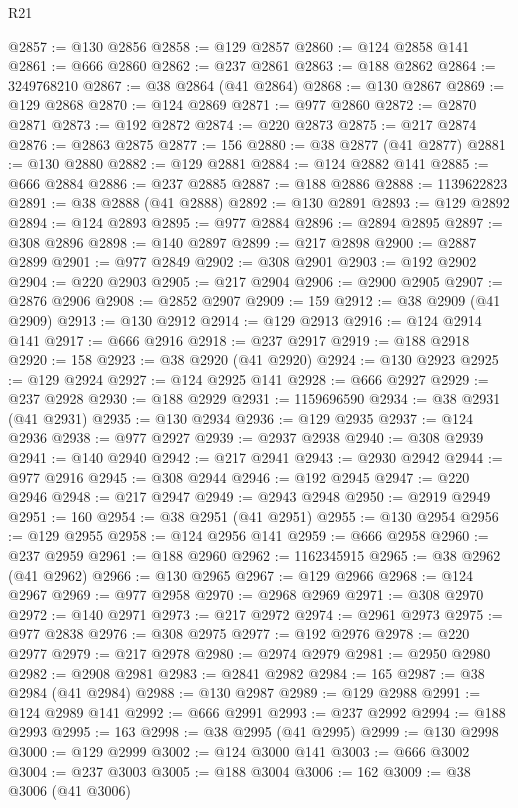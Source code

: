 \begin{lexlean}{R21}
\begin{coremodule}
@2857 := @130 @2856
@2858 := @129 @2857
@2860 := @124 @2858 @141
@2861 := @666 @2860
@2862 := @237 @2861
@2863 := @188 @2862
@2864 := 3249768210
@2867 := @38 @2864 (@41 @2864)
@2868 := @130 @2867
@2869 := @129 @2868
@2870 := @124 @2869
@2871 := @977 @2860
@2872 := @2870 @2871
@2873 := @192 @2872
@2874 := @220 @2873
@2875 := @217 @2874
@2876 := @2863 @2875
@2877 := 156
@2880 := @38 @2877 (@41 @2877)
@2881 := @130 @2880
@2882 := @129 @2881
@2884 := @124 @2882 @141
@2885 := @666 @2884
@2886 := @237 @2885
@2887 := @188 @2886
@2888 := 1139622823
@2891 := @38 @2888 (@41 @2888)
@2892 := @130 @2891
@2893 := @129 @2892
@2894 := @124 @2893
@2895 := @977 @2884
@2896 := @2894 @2895
@2897 := @308 @2896
@2898 := @140 @2897
@2899 := @217 @2898
@2900 := @2887 @2899
@2901 := @977 @2849
@2902 := @308 @2901
@2903 := @192 @2902
@2904 := @220 @2903
@2905 := @217 @2904
@2906 := @2900 @2905
@2907 := @2876 @2906
@2908 := @2852 @2907
@2909 := 159
@2912 := @38 @2909 (@41 @2909)
@2913 := @130 @2912
@2914 := @129 @2913
@2916 := @124 @2914 @141
@2917 := @666 @2916
@2918 := @237 @2917
@2919 := @188 @2918
@2920 := 158
@2923 := @38 @2920 (@41 @2920)
@2924 := @130 @2923
@2925 := @129 @2924
@2927 := @124 @2925 @141
@2928 := @666 @2927
@2929 := @237 @2928
@2930 := @188 @2929
@2931 := 1159696590
@2934 := @38 @2931 (@41 @2931)
@2935 := @130 @2934
@2936 := @129 @2935
@2937 := @124 @2936
@2938 := @977 @2927
@2939 := @2937 @2938
@2940 := @308 @2939
@2941 := @140 @2940
@2942 := @217 @2941
@2943 := @2930 @2942
@2944 := @977 @2916
@2945 := @308 @2944
@2946 := @192 @2945
@2947 := @220 @2946
@2948 := @217 @2947
@2949 := @2943 @2948
@2950 := @2919 @2949
@2951 := 160
@2954 := @38 @2951 (@41 @2951)
@2955 := @130 @2954
@2956 := @129 @2955
@2958 := @124 @2956 @141
@2959 := @666 @2958
@2960 := @237 @2959
@2961 := @188 @2960
@2962 := 1162345915
@2965 := @38 @2962 (@41 @2962)
@2966 := @130 @2965
@2967 := @129 @2966
@2968 := @124 @2967
@2969 := @977 @2958
@2970 := @2968 @2969
@2971 := @308 @2970
@2972 := @140 @2971
@2973 := @217 @2972
@2974 := @2961 @2973
@2975 := @977 @2838
@2976 := @308 @2975
@2977 := @192 @2976
@2978 := @220 @2977
@2979 := @217 @2978
@2980 := @2974 @2979
@2981 := @2950 @2980
@2982 := @2908 @2981
@2983 := @2841 @2982
@2984 := 165
@2987 := @38 @2984 (@41 @2984)
@2988 := @130 @2987
@2989 := @129 @2988
@2991 := @124 @2989 @141
@2992 := @666 @2991
@2993 := @237 @2992
@2994 := @188 @2993
@2995 := 163
@2998 := @38 @2995 (@41 @2995)
@2999 := @130 @2998
@3000 := @129 @2999
@3002 := @124 @3000 @141
@3003 := @666 @3002
@3004 := @237 @3003
@3005 := @188 @3004
@3006 := 162
@3009 := @38 @3006 (@41 @3006)

\end{coremodule}
\end{lexlean}
